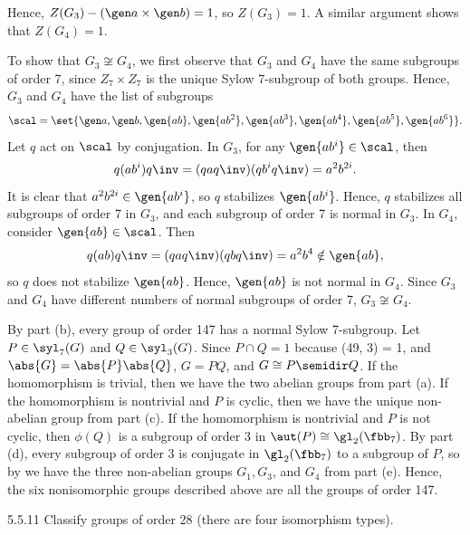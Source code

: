 \begin{solenum}
	Hence, $Z(G_3) - (\gen a \times \gen b) = 1$, so $Z(G_3) = 1$.
	A similar argument shows that $Z(G_4) = 1$.
    \item To show that $G_3 \not\cong G_4$, we first observe that $G_3$ and $G_4$ have the same subgroups of order 7, since $Z_7 \times Z_7$ is the unique Sylow 7-subgroup of both groups.
	Hence, $G_3$ and $G_4$ have the list of subgroups
    \[
    	\scal = \set{\gen a, \gen b, \gen{ab}, \gen{ab^2}, \gen{ab^3}, \gen{ab^4}, \gen{ab^5}, \gen{ab^6}}.
    \]
    Let $q$ act on $\scal$ by conjugation.
	In $G_3$, for any $\gen{ab^i} \in \scal$, then
    \[
    	q(ab^i)q\inv = (qaq\inv)(qb^iq\inv) = a^2b^{2i}.
    \]
    It is clear that $a^2b^{2i} \in \gen{ab^i}$, so $q$ stabilizes $\gen{ab^i}$.
	Hence, $q$ stabilizes all subgroups of order 7 in $G_3$, and each subgroup of order 7 is normal in $G_3$.
	In $G_4$, consider $\gen{ab} \in \scal$.
	Then
    \[
    	q(ab)q\inv = (qaq\inv)(qbq\inv) = a^2b^4 \notin \gen{ab},
    \]
    so $q$ does not stabilize $\gen{ab}$.
	Hence, $\gen{ab}$ is not normal in $G_4$.
	Since $G_3$ and $G_4$ have different numbers of normal subgroups of order 7, $G_3 \not\cong G_4$.
    \item By part (b), every group of order 147 has a normal Sylow 7-subgroup.
	Let $P \in \syl_7(G)$ and $Q \in \syl_3(G)$.
	Since $P \cap Q = 1$ because (49, 3) = 1, and $\abs{G} = \abs{P}\abs{Q}$, $G = PQ$, and $G \cong P \semidir Q$.
	If the homomorphism is trivial, then we have the two abelian groups from part (a).
	If the homomorphism is nontrivial and $P$ is cyclic, then we have the unique non-abelian group from part (c).
	If the homomorphism is nontrivial and $P$ is not cyclic, then $\phi(Q)$ is a subgroup of order 3 in $\aut(P) \cong \gl_2(\fbb_7)$.
	By part (d), every subgroup of order 3 is conjugate in $\gl_2(\fbb_7)$ to a subgroup of $P$, so by  we have the three non-abelian groups $G_1, G_3$, and $G_4$ from part (e).
	Hence, the six nonisomorphic groups described above are all the groups of order 147.
\end{solenum}

\begin{exercise}{5.5.11}
    Classify groups of order 28 (there are four isomorphism types).
\end{exercise}

